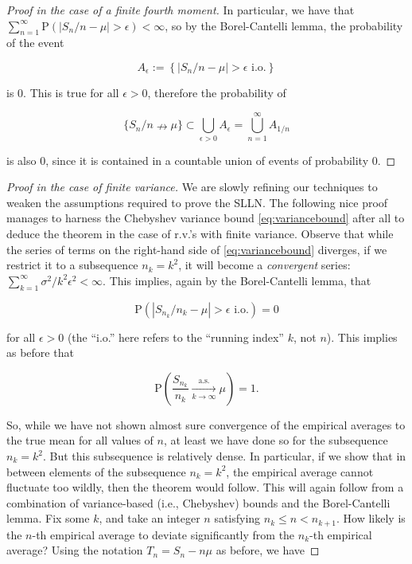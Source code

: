 \documentclass[11pt]{report}
\theoremstyle{plain}
\theoremstyle{definition}
\begin{document}
\begin{proof}[Proof in the case of a finite fourth moment]
\noindent In particular, we have that
$\sum_{n=1}^\infty \mathrm{P}(|S_n/n-\mu|>\epsilon)
<\infty$,
so by the Borel-Cantelli lemma, the probability of the
event

\[
A_\epsilon := \left\{|S_n/n-\mu|>\epsilon \textrm{ i.o.}\right\}
\]

\noindent is $0$. This is true for all $\epsilon>0$, therefore
the probability of

\[
\{S_n/n\nrightarrow \mu\} \subset \bigcup_{\epsilon>0} A_\epsilon = \bigcup_{n=1}^\infty A_{1/n}
\]

\noindent is also $0$, since it is contained in a countable
union of events of probability 0.
\end{proof}

\begin{proof}[Proof in the case of finite variance]
We are slowly refining our techniques to weaken the
assumptions required to prove the SLLN. The following
nice proof manages to harness the Chebyshev variance
bound \eqref{eq:variancebound} after all to deduce the
theorem in the case of r.v.'s with finite variance.
Observe that while the series of terms on the
right-hand side of \eqref{eq:variancebound} diverges, if
we restrict it to a subsequence $n_k = k^2$, it will
become a \emph{convergent} series:
$\sum_{k=1}^\infty \sigma^2/k^2\epsilon^2<\infty$.
This implies, again by the Borel-Cantelli lemma, that

\[
\mathrm{P}(|S_{n_k}/{n_k} - \mu| > \epsilon \textrm{ i.o.}) = 0
\]

\noindent for all $\epsilon>0$ (the ``i.o.'' here refers to the
``running index'' $k$, not $n$). This implies as
before that

\[
\mathrm{P}\left(\frac{S_{n_k}}{n_k}\xrightarrow[k\to\infty]{\textrm{a.s.}} \mu\right) = 1.
\]

\noindent So, while we have not shown almost sure convergence
of the empirical averages to the true mean for all
values of $n$, at least we have done so for the
subsequence $n_k=k^2$. But this subsequence is
relatively dense. In particular, if we show that in
between elements of the subsequence $n_k=k^2$, the
empirical average cannot fluctuate too wildly, then
the theorem would follow. This will again follow from
a combination of variance-based (i.e., Chebyshev)
bounds and the Borel-Cantelli lemma. Fix some $k$,
and take an integer $n$ satisfying
$n_k\le n < n_{k+1}$. How likely is the $n$-th
empirical average to deviate significantly from the
$n_k$-th empirical average? Using the notation
$T_n=S_n-n\mu$ as before, we have


\end{proof}
\end{document}
